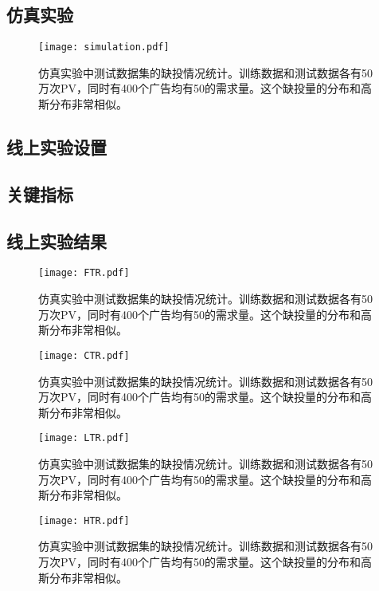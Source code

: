 \subsection{仿真实验}

\begin{figure}[tb]
	\centering
	\texttt{[image: simulation.pdf]}
	\caption{仿真实验中测试数据集的缺投情况统计。训练数据和测试数据各有50万次PV，同时有400个广告均有50的需求量。这个缺投量的分布和高斯分布非常相似。}
	\label{fig:delivery}
\end{figure}

\subsection{线上实验设置}

\subsection{关键指标}

\subsection{线上实验结果}

\begin{figure}[tb]
	\centering
	\texttt{[image: FTR.pdf]}
	\caption{仿真实验中测试数据集的缺投情况统计。训练数据和测试数据各有50万次PV，同时有400个广告均有50的需求量。这个缺投量的分布和高斯分布非常相似。}
	\label{fig:delivery}
\end{figure}

\begin{figure}[tb]
	\centering
	\texttt{[image: CTR.pdf]}
	\caption{仿真实验中测试数据集的缺投情况统计。训练数据和测试数据各有50万次PV，同时有400个广告均有50的需求量。这个缺投量的分布和高斯分布非常相似。}
	\label{fig:delivery}
\end{figure}

\begin{figure}[tb]
	\centering
	\texttt{[image: LTR.pdf]}
	\caption{仿真实验中测试数据集的缺投情况统计。训练数据和测试数据各有50万次PV，同时有400个广告均有50的需求量。这个缺投量的分布和高斯分布非常相似。}
	\label{fig:delivery}
\end{figure}

\begin{figure}[tb]
	\centering
	\texttt{[image: HTR.pdf]}
	\caption{仿真实验中测试数据集的缺投情况统计。训练数据和测试数据各有50万次PV，同时有400个广告均有50的需求量。这个缺投量的分布和高斯分布非常相似。}
	\label{fig:delivery}
\end{figure}






